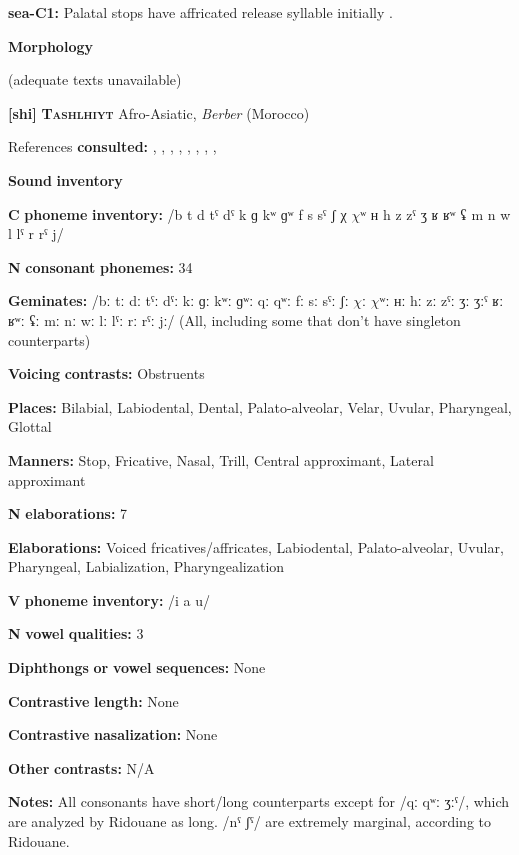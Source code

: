 \begin{styleBody}
\textbf{sea-C1:} Palatal stops have affricated release syllable initially \citep[5]{Philips2007}.

\textbf{Morphology}

(adequate texts unavailable)

\textbf{[shi]}   \textbf{\textsc{Tashlhiyt}}  Afro-Asiatic, \textit{Berber} (Morocco)

References \textbf{consulted:} \citet{Coleman2001}, \citet{DellElmedlaoui2002}, \citet{GordonNafi2012}, \citet{PuechLouali1999}, \citet{Ridouane2002}, \citet{Ridouane2007}, \citet{Ridouane2008}, \citet{Ridouane2014}, \citet{RoettgerEtAl2015}

\textbf{Sound} \textbf{inventory}

\textbf{C} \textbf{phoneme} \textbf{inventory:} /b t d tˤ dˤ k ɡ kʷ ɡʷ f s sˤ ʃ χ $\chi ʷ$ ʜ h z zˤ ʒ ʁ ʁʷ ʢ m n w l lˤ r rˤ j/

\textbf{N} \textbf{consonant} \textbf{phonemes:} 34

\textbf{Geminates:} /bː tː dː tˤː dˤː kː ɡː kʷː ɡʷː qː qʷː fː sː sˤː ʃː $\chi ː$ $\chi ʷː$ ʜː hː zː zˤː ʒː ʒːˤ ʁː ʁʷː ʢː mː nː wː lː lˤː rː rˤː jː/ (All, including some that don’t have singleton counterparts)

\textbf{Voicing} \textbf{contrasts:} Obstruents

\textbf{Places:} Bilabial, Labiodental, Dental, Palato-alveolar, Velar, Uvular, Pharyngeal, Glottal

\textbf{Manners:} Stop, Fricative, Nasal, Trill, Central approximant, Lateral approximant

\textbf{N} \textbf{elaborations:} 7

\textbf{Elaborations:} Voiced fricatives/affricates, Labiodental, Palato-alveolar, Uvular, Pharyngeal, Labialization, Pharyngealization

\textbf{V} \textbf{phoneme} \textbf{inventory:} /i a u/

\textbf{N} \textbf{vowel} \textbf{qualities:} 3

\textbf{Diphthongs} \textbf{or} \textbf{vowel} \textbf{sequences:} None

\textbf{Contrastive} \textbf{length:} None

\textbf{Contrastive} \textbf{nasalization:} None

\textbf{Other} \textbf{contrasts:} N/A

\textbf{Notes:} All consonants have short/long counterparts except for /qː qʷː ʒːˤ/, which are analyzed by Ridouane as long. /nˤ ʃˤ/ are extremely marginal, according to Ridouane.


\end{styleBody}
